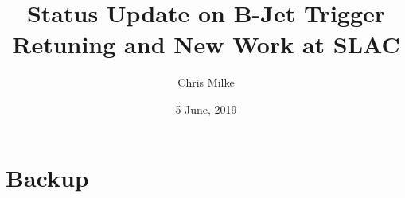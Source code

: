 \documentclass{beamer}
\begin{document}
\title{Status Update on B-Jet Trigger Retuning and New Work at SLAC}   
\author{Chris Milke} 
\date{5 June, 2019} 

\frame{\titlepage} 



\section{Backup} 
%
%
\end{document}
